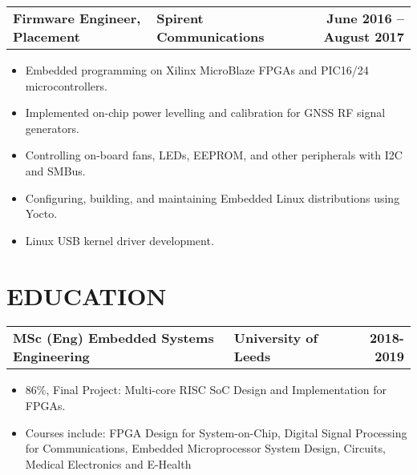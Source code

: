 \documentclass[letterpaper,11pt]{article}
\makeatletter
\newcommand{\resumeItem}[1]{
  \item\small{
    {#1 \vspace{-5pt}}
  }
}
\newcommand{\resumeSubheading}[3]{
    \begin{center}
    \begin{tabularx}{1\textwidth}{XP{9.4cm}r}
      \small\textbf{#1} & \textbf{#2} & \textbf{#3}
    \end{tabularx}\vspace{-7pt}
    \end{center}
}
\newcommand{\resumeSubSubheading}[2]{
    \item
    \begin{tabular*}{1\textwidth}{l@{\extracolsep{\fill}}r}
      \textit{\small#1} & \textit{\small #2}
    \end{tabular*}\vspace{-7pt}
}
\newcommand{\resumeSubHeadingListEnd}{\end{itemize}}
\newcommand{\resumeItemListStart}{\begin{itemize}[label={\large\textbullet}]}
\newcommand{\resumeItemListEnd}{\end{itemize}\vspace{10pt}}
\makeatother
\begin{document}
    \begin{tabularx}{1\textwidth}{p{7cm}Xr}
      \small\textbf{Firmware Engineer, Placement} & \small\textbf{Spirent Communications} & \small\textbf{June 2016 -- August 2017}  \\
    \end{tabularx}\vspace{-3pt}
        \resumeItemListStart
        \resumeItem{Embedded programming on Xilinx MicroBlaze FPGAs and PIC16/24 microcontrollers.}
\resumeItem{Implemented on-chip power levelling and calibration for GNSS RF signal generators.}
\resumeItem{Controlling on-board fans, LEDs, EEPROM, and other peripherals with I2C and SMBus.}
\resumeItem{Configuring, building, and maintaining Embedded Linux distributions using Yocto.}
\resumeItem{Linux USB kernel driver development.}
    \resumeItemListEnd
      


\section{EDUCATION}
    \begin{tabularx}{1\textwidth}{p{7.8cm}Xr}
      \small\textbf{MSc (Eng) Embedded Systems Engineering} & \small\textbf{University of Leeds} & \small\textbf{2018-2019} \\
    \end{tabularx}\vspace{-3pt}
    \resumeItemListStart
\resumeItem{86\%, Final Project: Multi-core RISC SoC Design and Implementation for FPGAs.}
\resumeItem{Courses include: FPGA Design for System-on-Chip, Digital Signal Processing for Communications,
Embedded Microprocessor System Design, Circuits, Medical Electronics and E-Health}
    \resumeItemListEnd
    
\end{document}
